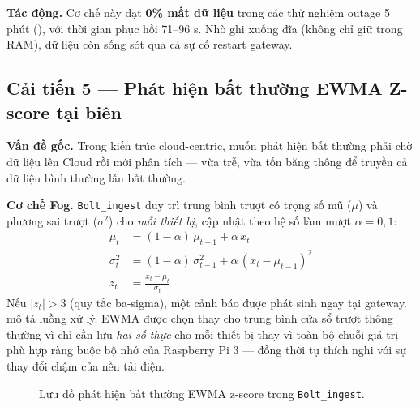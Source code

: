 \documentclass[13pt,a4paper]{report}
\newcommand{\code}[1]{\texttt{\small #1}}
\begin{document}
\textbf{Tác động.} Cơ chế này đạt \textbf{0\% mất dữ liệu} trong các thử nghiệm
outage 5 phút (), với thời gian phục hồi 71--96 s. Nhờ ghi
xuống đĩa (không chỉ giữ trong RAM), dữ liệu còn sống sót qua cả sự cố restart
gateway.

\subsection{Cải tiến 5 --- Phát hiện bất thường EWMA Z-score tại biên}

\textbf{Vấn đề gốc.} Trong kiến trúc cloud-centric, muốn phát hiện bất thường phải
chờ dữ liệu lên Cloud rồi mới phân tích --- vừa trễ, vừa tốn băng thông để truyền
cả dữ liệu bình thường lẫn bất thường.

\textbf{Cơ chế Fog.} \code{Bolt\_ingest} duy trì trung bình trượt có trọng số mũ
($\mu$) và phương sai trượt ($\sigma^2$) cho \textit{mỗi thiết bị}, cập nhật theo
hệ số làm mượt $\alpha = 0{,}1$:
\begin{align}
\mu_t &= (1-\alpha)\,\mu_{t-1} + \alpha\, x_t \\
\sigma^2_t &= (1-\alpha)\,\sigma^2_{t-1} + \alpha\,(x_t - \mu_{t-1})^2 \\
z_t &= \frac{x_t - \mu_t}{\sigma_t}
\end{align}
Nếu $|z_t| > 3$ (quy tắc ba-sigma), một cảnh báo được phát sinh ngay tại gateway.
 mô tả luồng xử lý. EWMA được chọn thay cho trung bình cửa sổ
trượt thông thường vì chỉ cần lưu \textit{hai số thực} cho mỗi thiết bị thay vì
toàn bộ chuỗi giá trị --- phù hợp ràng buộc bộ nhớ của Raspberry Pi 3 --- đồng thời
tự thích nghi với sự thay đổi chậm của nền tải điện.

\begin{figure}[H]
\centering
{}
\caption{Lưu đồ phát hiện bất thường EWMA z-score trong \code{Bolt\_ingest}.}
\label{fig:imp-ewma}
\end{figure}
\end{document}
